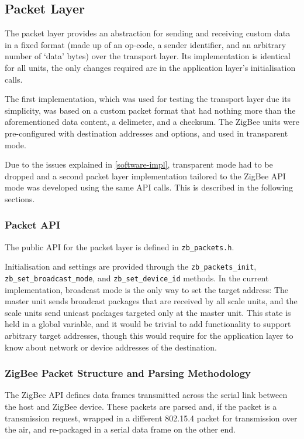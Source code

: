 \subsection{Packet Layer}
The packet layer provides an abstraction for sending and receiving custom data in a fixed format (made up of an op-code, a sender identifier, and an arbitrary number of `data' bytes) over the transport layer. Its implementation is identical for all units, the only changes required are in the application layer's initialisation calls.

The first implementation, which was used for testing the transport layer due its simplicity, was based on a custom packet format that had nothing more than the aforementioned data content, a delimeter, and a checksum. The ZigBee units were pre-configured with destination addresses and options, and used in transparent mode.

Due to the issues explained in \ref{software-impl}, transparent mode had to be dropped and a second packet layer implementation tailored to the ZigBee API mode was developed using the same API calls. This is described in the following sections.

\subsubsection{Packet API}
The public API for the packet layer is defined in \texttt{zb\_packets.h}. 

Initialisation and settings are provided through the \texttt{zb\_packets\_init}, \texttt{zb\_set\_broadcast\_mode}, and \texttt{zb\_set\_device\_id} methods. In the current implementation, broadcast mode is the only way to set the target address: The master unit sends broadcast packages that are received by all scale units, and the scale units send unicast packages targeted only at the master unit. This state is held in a global variable, and it would be trivial to add functionality to support arbitrary target addresses, though this would require for the application layer to know about network or device addresses of the destination.


\subsubsection{ZigBee Packet Structure and Parsing Methodology}
The ZigBee API defines data frames transmitted across the serial link between the host and ZigBee device. These packets are parsed and, if the packet is a transmission request, wrapped in a different 802.15.4 packet for transmission over the air, and re-packaged in a serial data frame on the other end.


